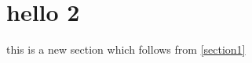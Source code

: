 \section{hello 2}
\label{section 2}
\noindent
this is a new section which follows from \ref{section1}

